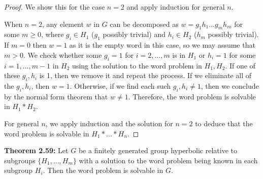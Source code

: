 \documentclass[12pt]{article}
\newcommand{\vs}{\vskip10pt}
\begin{document}
	\begin{proof}
		
	We show this for the case $n = 2$ and apply induction for general $n$. 
	
	\vs 
	
	When $n=2$, any element $w$ in $G$ can be decomposed as $w = g_1 h_1 ... g_m h_m$ for some $m \geq 0$, where $g_i \in H_1$ ($g_1$ possibly trivial) and $h_i \in H_2$ ($h_m$ possibly trivial). If $m = 0$ then $w = 1$ as it is the empty word in this case, so we may assume that $m > 0$. We check whether some $g_i = 1$ for $i = 2,...,m$ is in $H_1$ or $h_i = 1$ for some $i = 1,...,m-1$ in $H_2$ using the solution to the word problem in $H_1, H_2$. If one of these $g_i, h_i$ is 1, then we remove it and repeat the process. If we eliminate all of the $g_i, h_i$, then $w = 1$. Otherwise, if we find each such $g_i, h_i \neq 1$, then we conclude by the normal form theorem that $w \neq 1$. Therefore, the word problem is solvable in $H_1 * H_2$. 
	
	\vs 
	
	For general $n$, we apply induction and the solution for $n = 2$ to deduce that the word problem is solvable in $H_1 * ... * H_n$.
	
	\end{proof}
	
	\vs
	
	\textbf{Theorem 2.59: } Let $G$ be a finitely generated group hyperbolic relative to subgroups $\{H_1,...,H_m\}$ with a solution to the word problem being known in each subgroup $H_i$. Then the word problem is solvable in $G$. 
	
\end{document}
